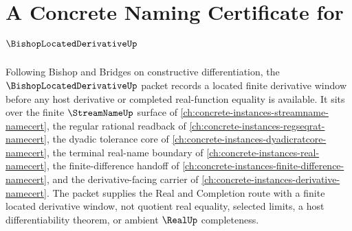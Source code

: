 \chapter{A Concrete Naming Certificate for $\BishopLocatedDerivativeUp$}
\label{ch:concrete-instances-bishop-located-derivative-namecert}

Following Bishop and Bridges on constructive differentiation, the $\BishopLocatedDerivativeUp$ packet records a located finite derivative window before any host derivative or completed real-function equality is available. It sits over the finite $\StreamNameUp$ surface of \autoref{ch:concrete-instances-streamname-namecert}, the regular rational readback of \autoref{ch:concrete-instances-regseqrat-namecert}, the dyadic tolerance core of \autoref{ch:concrete-instances-dyadicratcore-namecert}, the terminal real-name boundary of \autoref{ch:concrete-instances-real-namecert}, the finite-difference handoff of \autoref{ch:concrete-instances-finite-difference-namecert}, and the derivative-facing carrier of \autoref{ch:concrete-instances-derivative-namecert}. The packet supplies the Real and Completion route with a finite located derivative window, not quotient real equality, selected limits, a host differentiability theorem, or ambient $\RealUp$ completeness.

